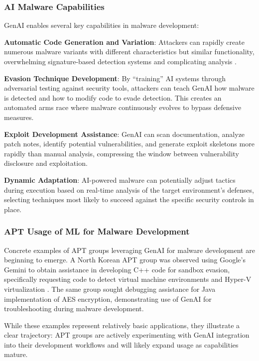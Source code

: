 \subsubsection{AI Malware Capabilities}

GenAI enables several key capabilities in malware development:

\textbf{Automatic Code Generation and Variation}: Attackers can rapidly create numerous malware variants with different characteristics but similar functionality, overwhelming signature-based detection systems and complicating analysis \cite{barracuda2024}.

\textbf{Evasion Technique Development}: By ``training'' AI systems through adversarial testing against security tools, attackers can teach GenAI how malware is detected and how to modify code to evade detection. This creates an automated arms race where malware continuously evolves to bypass defensive measures.

\textbf{Exploit Development Assistance}: GenAI can scan documentation, analyze patch notes, identify potential vulnerabilities, and generate exploit skeletons more rapidly than manual analysis, compressing the window between vulnerability disclosure and exploitation.

\textbf{Dynamic Adaptation}: AI-powered malware can potentially adjust tactics during execution based on real-time analysis of the target environment's defenses, selecting techniques most likely to succeed against the specific security controls in place.

\subsubsection{APT Usage of ML for Malware Development}

Concrete examples of APT groups leveraging GenAI for malware development are beginning to emerge. A North Korean APT group was observed using Google's Gemini to obtain assistance in developing C++ code for sandbox evasion, specifically requesting code to detect virtual machine environments and Hyper-V virtualization \cite{google2025}. The same group sought debugging assistance for Java implementation of AES encryption, demonstrating use of GenAI for troubleshooting during malware development.

While these examples represent relatively basic applications, they illustrate a clear trajectory: APT groups are actively experimenting with GenAI integration into their development workflows and will likely expand usage as capabilities mature.

